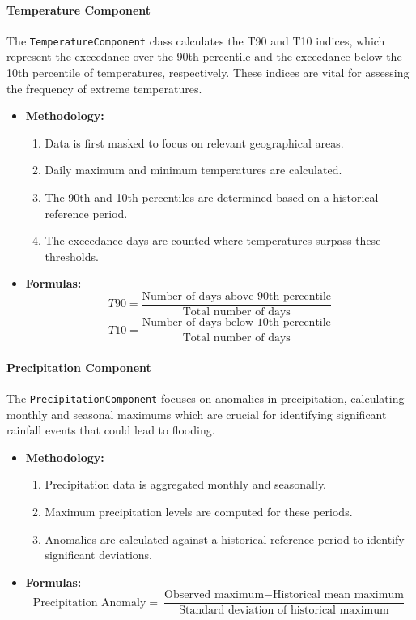 \documentclass[a4paper,12pt]{article}
\begin{document}
\paragraph{Temperature Component}
The \texttt{TemperatureComponent} class calculates the T90 and T10 indices, which represent the exceedance over the 90th percentile and the exceedance below the 10th percentile of temperatures, respectively. These indices are vital for assessing the frequency of extreme temperatures.

\begin{itemize}
    \item \textbf{Methodology:}
    \begin{enumerate}
        \item Data is first masked to focus on relevant geographical areas.
        \item Daily maximum and minimum temperatures are calculated.
        \item The 90th and 10th percentiles are determined based on a historical reference period.
        \item The exceedance days are counted where temperatures surpass these thresholds.
    \end{enumerate}
    \item \textbf{Formulas:}
    \[
    T90 = \frac{\text{Number of days above 90th percentile}}{\text{Total number of days}}
    \]
    \[
    T10 = \frac{\text{Number of days below 10th percentile}}{\text{Total number of days}}
    \]
\end{itemize}

\paragraph{Precipitation Component}
The \texttt{PrecipitationComponent} focuses on anomalies in precipitation, calculating monthly and seasonal maximums which are crucial for identifying significant rainfall events that could lead to flooding.

\begin{itemize}
    \item \textbf{Methodology:}
    \begin{enumerate}
        \item Precipitation data is aggregated monthly and seasonally.
        \item Maximum precipitation levels are computed for these periods.
        \item Anomalies are calculated against a historical reference period to identify significant deviations.
    \end{enumerate}
    \item \textbf{Formulas:}
    \[
    \text{Precipitation Anomaly} = \frac{\text{Observed maximum} - \text{Historical mean maximum}}{\text{Standard deviation of historical maximum}}
    \]
\end{itemize}
\end{document}
